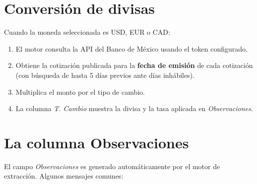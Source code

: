 \documentclass[12pt, a4paper, oneside]{report}
\newcommand{\btn}[1]{\texttt{\colorbox{vino!15}{\strut#1}}}
\newcommand{\campo}[1]{\textit{#1}}
\begin{document}
\section{Conversión de divisas}

Cuando la moneda seleccionada es USD, EUR o CAD:

\begin{enumerate}
  \item El motor consulta la API del Banco de México usando el token configurado.
  \item Obtiene la cotización publicada para la \textbf{fecha de emisión} de cada
        cotización (con búsqueda de hasta 5 días previos ante días inhábiles).
  \item Multiplica el monto por el tipo de cambio.
  \item La columna \campo{T. Cambio} muestra la divisa y la tasa aplicada en \campo{Observaciones}.
\end{enumerate}


\section{La columna Observaciones}

El campo \campo{Observaciones} es generado automáticamente por el motor de
extracción. Algunos mensajes comunes:
\end{document}
